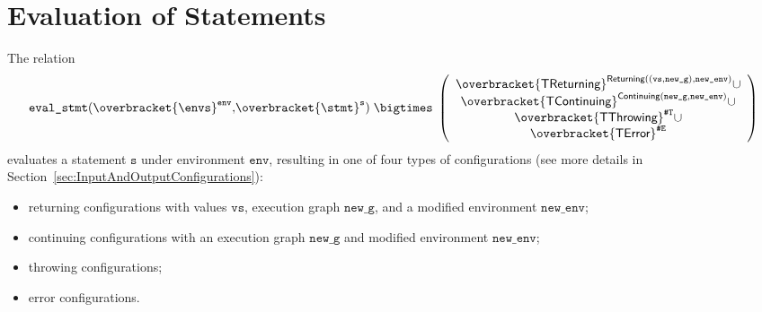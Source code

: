 \documentclass{book}
\newcommand\secref[1]{Section~\ref{sec:#1}}
\newcommand\overname[2]{\overbracket{#1}^{#2}}
\newcommand\aslrel[0]{\bigtimes}
\newcommand\aslsep[0]{\mathbf{,}}
\newcommand\ThrowingConfig[0]{\texttt{\#T}}
\newcommand\ErrorConfig[0]{\texttt{\#E}}
\newcommand\TError[0]{\textsf{TError}}
\newcommand\TThrowing[0]{\textsf{TThrowing}}
\newcommand\TContinuing[0]{\textsf{TContinuing}}
\newcommand\TReturning[0]{\textsf{TReturning}}
\newcommand\evalstmt[1]{\texttt{eval\_stmt}(#1)}
\newcommand\Continuing[0]{\textsf{Continuing}}
\newcommand\Returning[0]{\textsf{Returning}}
\newcommand\newenv[0]{\texttt{new\_env}}
\newcommand\env[0]{\texttt{env}}
\newcommand\newg[0]{\texttt{new\_g}}
\newcommand\vs[0]{\texttt{s}}
\newcommand\vvs[0]{\texttt{vs}}
\begin{document}

\chapter{Evaluation of Statements \label{chap:eval_stmt}}

The relation
\[
  \evalstmt{\overname{\envs}{\env} \aslsep \overname{\stmt}{\vs}} \;\aslrel\;
  \left(
  \begin{array}{c}
  \overname{\TReturning}{\Returning((\vvs,\newg), \newenv)} \cup\\
  \overname{\TContinuing}{\Continuing(\newg,\newenv)} \cup\\
  \overname{\TThrowing}{\ThrowingConfig} \cup \\
  \overname{\TError}{\ErrorConfig}
  \end{array}
  \right)
\]
evaluates a statement $\vs$ under environment $\env$, resulting in one of four types of configurations
(see more details in \secref{InputAndOutputConfigurations}):
\begin{itemize}
  \item returning configurations with values $\vvs$, execution graph $\newg$, and a modified environment $\newenv$;
  \item continuing configurations with an execution graph $\newg$ and modified environment $\newenv$;
  \item throwing configurations;
  \item error configurations.
\end{itemize}
\end{document}
